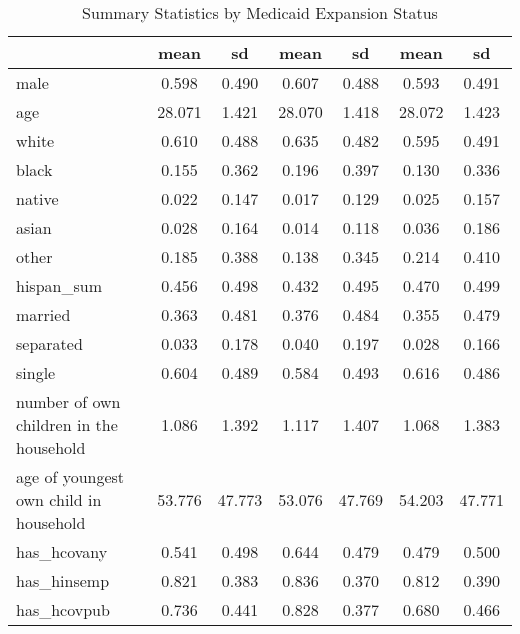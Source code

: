 \begin{table}[htbp]\centering
\def\sym#1{\ifmmode^{#1}\else\(^{#1}\)\fi}
\caption{Summary Statistics by Medicaid Expansion Status}
\begin{tabular}{l*{3}{cc}}
\hline\hline
                    &        mean&          sd&        mean&          sd&        mean&          sd\\
\hline
male                &       0.598&       0.490&       0.607&       0.488&       0.593&       0.491\\
age                 &      28.071&       1.421&      28.070&       1.418&      28.072&       1.423\\
white               &       0.610&       0.488&       0.635&       0.482&       0.595&       0.491\\
black               &       0.155&       0.362&       0.196&       0.397&       0.130&       0.336\\
native              &       0.022&       0.147&       0.017&       0.129&       0.025&       0.157\\
asian               &       0.028&       0.164&       0.014&       0.118&       0.036&       0.186\\
other               &       0.185&       0.388&       0.138&       0.345&       0.214&       0.410\\
hispan\_sum          &       0.456&       0.498&       0.432&       0.495&       0.470&       0.499\\
married             &       0.363&       0.481&       0.376&       0.484&       0.355&       0.479\\
separated           &       0.033&       0.178&       0.040&       0.197&       0.028&       0.166\\
single              &       0.604&       0.489&       0.584&       0.493&       0.616&       0.486\\
number of own children in the household&       1.086&       1.392&       1.117&       1.407&       1.068&       1.383\\
age of youngest own child in household&      53.776&      47.773&      53.076&      47.769&      54.203&      47.771\\
has\_hcovany         &       0.541&       0.498&       0.644&       0.479&       0.479&       0.500\\
has\_hinsemp         &       0.821&       0.383&       0.836&       0.370&       0.812&       0.390\\
has\_hcovpub         &       0.736&       0.441&       0.828&       0.377&       0.680&       0.466\\

\end{tabular}
\end{table}
